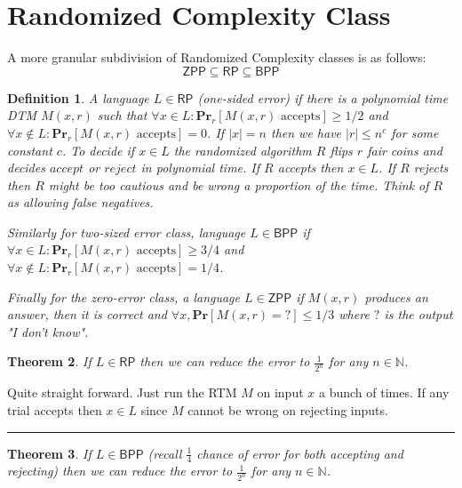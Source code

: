 \documentclass[twoside]{article}
\newcounter{lecnum}
\newtheorem{theorem}{Theorem}[lecnum]
\newtheorem{definition}[theorem]{Definition}
\newenvironment{proof}{{\bf Proof:}}{\hfill\rule{2mm}{2mm}}
\def\N{\mathbb{N}}
\def\Pr{\mathbf{Pr}}
\def\BPP{\mathsf{BPP}}
\def\RP{\mathsf{RP}}
\def\ZPP{\mathsf{ZPP}}
\begin{document}
\section{Randomized Complexity Class}
A more granular subdivision of Randomized Complexity classes is as follows:
\[\ZPP \subseteq \RP \subseteq \BPP\]
\begin{definition}
A language $L \in \RP$ (one-sided error) if there is a polynomial time DTM $M(x, r)$ such that $\forall x \in L: \Pr_r[M(x,r) \mbox{ accepts}] \geq 1/2$ and $\forall x \notin L: \Pr_r[M(x,r) \mbox{ accepts}] = 0$. If $|x| = n$ then we have $|r| \leq n^c$ for some constant $c$. To decide if $x \in L$ the randomized algorithm $R$ flips $r$ fair coins and decides $accept$ or $reject$ in polynomial time. If $R$ accepts then $x \in L$. If $R$ rejects then $R$ might be too cautious and be wrong a proportion of the time. Think of $R$ as allowing false negatives.

Similarly for two-sized error class, language $L \in \BPP$ if $\forall x \in L: \Pr_r[M(x,r) \mbox{ accepts}] \geq 3/4$ and $\forall x \notin L: \Pr_r[M(x,r) \mbox{ accepts}] = 1/4$.

Finally for the zero-error class, a language $L \in \ZPP$ if $M(x,r)$ produces an answer, then it is correct and $\forall x, \Pr[M(x,r) = ?] \leq 1/3$ where $?$ is the output \emph{"I don't know"}.  
\end{definition}

\begin{theorem}
If $L \in \RP$ then we can reduce the error to $\frac{1}{2^n}$ for any $n\in \N$.
\end{theorem}
\begin{proof}
Quite straight forward. Just run the RTM $M$ on input $x$ a bunch of times. If any trial accepts then $x \in L$ since $M$ cannot be wrong on rejecting inputs.
\end{proof}

\begin{theorem}
If $L \in \BPP$ (recall $\frac{1}{4}$ chance of error for both accepting and rejecting) then we can reduce the error to $\frac{1}{2^n}$ for any $n\in \N$.
\end{theorem}
\end{document}

